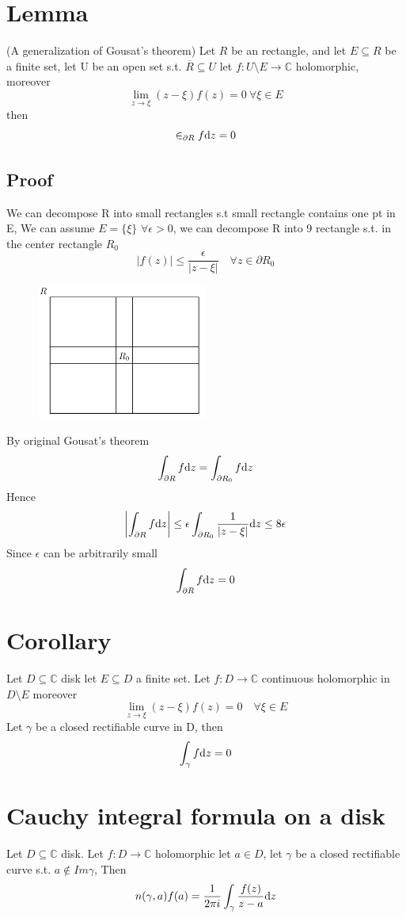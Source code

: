 \documentclass{book}
\newcommand{\abs}[1]{\left\lvert #1 \right\rvert}
\begin{document}
\section{Lemma}
(A generalization of Gousat's theorem)
Let $R$ be an rectangle, and let $E\subseteq R$ be a finite set, let U be an open set s.t. $\overline R\subseteq U$ let $f:U\setminus E\to \mathbb C$ holomorphic, moreover$$\lim\limits_{z\to \xi}(z-\xi)f(z)=0\ \forall \xi\in E$$ then$$\in_{\partial R}f\text dz=0$$
\subsection{Proof}
We can decompose R into small rectangles s.t small rectangle contains one pt in E, We can assume $E=\{\xi\}$ $\forall \epsilon>0$, we can decompose R into 9 rectangle s.t. in the center rectangle $R_0$$$\abs{f(z)}\leq\frac{\epsilon}{\abs{z-\xi}}\quad\forall z\in \partial R_0$$ 
\begin{figure}
    \centering
    \includegraphics[width=0.5\textwidth]{figure/3.png}
\end{figure}
By original Gousat's theorem$$\int_{\partial R}f\text dz=\int_{\partial R_0}f\text dz$$
Hence$$\abs{\int_{\partial R}f\text dz}\leq\epsilon\int_{\partial R_0}\frac{1}{\abs{z-\xi}}\text dz\leq 8\epsilon$$
Since $\epsilon$ can be arbitrarily small$$\int_{\partial R}f\text dz=0$$
\section{Corollary}
Let $D\subseteq\mathbb C$ disk let $E\subseteq D$ a finite set. Let $f:D\to \mathbb C$ continuous holomorphic in $D\setminus E$ moreover$$\lim\limits_{z\to \xi}(z-\xi)f(z)=0\quad\forall \xi \in E$$
Let $\gamma $ be a closed rectifiable curve in D, then $$\int_\gamma f\text dz=0$$
\section{Cauchy integral formula on a disk}
\label{Cauchy's integral formula on a disk}
Let $D\subseteq \mathbb C$ disk. Let $f:D\to \mathbb C$ holomorphic let $a\in D$, let $\gamma$ be a closed rectifiable curve s.t. $a\notin Im\gamma$, Then $$n(\gamma,a)f(a)=\frac{1}{2\pi i}\int_\gamma\frac{f(z)}{z-a}\text dz$$
\end{document}
